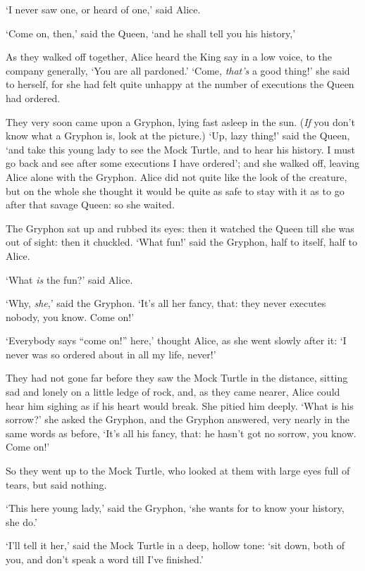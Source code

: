   `I never saw one, or heard of one,' said Alice.

  `Come on, then,' said the Queen, `and he shall tell you his
history,'

  As they walked off together, Alice heard the King say in a low
voice, to the company generally, `You are all pardoned.'  `Come,
{\it that's} a good thing!' she said to herself, for she had felt quite
unhappy at the number of executions the Queen had ordered.

  They very soon came upon a Gryphon, lying fast asleep in the
sun.  ({\it If} you don't know what a Gryphon is, look at the picture.)
`Up, lazy thing!' said the Queen, `and take this young lady to
see the Mock Turtle, and to hear his history.  I must go back and
see after some executions I have ordered'; and she walked off,
leaving Alice alone with the Gryphon.  Alice did not quite like
the look of the creature, but on the whole she thought it would
be quite as safe to stay with it as to go after that savage
Queen:  so she waited.

  The Gryphon sat up and rubbed its eyes:  then it watched the
Queen till she was out of sight:  then it chuckled.  `What fun!'
said the Gryphon, half to itself, half to Alice.

  `What {\it is} the fun?' said Alice.

  `Why, {\it she},' said the Gryphon.  `It's all her fancy, that:  they
never executes nobody, you know.  Come on!'

  `Everybody says ``come on!'' here,' thought Alice, as she went
slowly after it:  `I never was so ordered about in all my life,
never!'

  They had not gone far before they saw the Mock Turtle in the
distance, sitting sad and lonely on a little ledge of rock, and,
as they came nearer, Alice could hear him sighing as if his heart
would break.  She pitied him deeply.  `What is his sorrow?' she
asked the Gryphon, and the Gryphon answered, very nearly in the
same words as before, `It's all his fancy, that:  he hasn't got
no sorrow, you know.  Come on!'

  So they went up to the Mock Turtle, who looked at them with
large eyes full of tears, but said nothing.

  `This here young lady,' said the Gryphon, `she wants for to
know your history, she do.'

  `I'll tell it her,' said the Mock Turtle in a deep, hollow
tone:  `sit down, both of you, and don't speak a word till I've
finished.'

